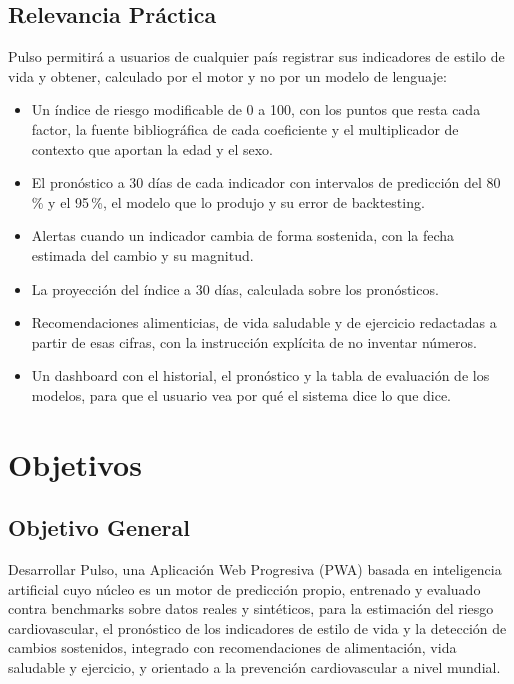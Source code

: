 \documentclass[12pt,letterpaper]{article}
\begin{document}
\subsection{Relevancia Práctica}

Pulso permitirá a usuarios de cualquier país registrar sus indicadores de estilo
de vida y obtener, calculado por el motor y no por un modelo de lenguaje:

\begin{itemize}
  \item Un índice de riesgo modificable de 0 a 100, con los puntos que resta
    cada factor, la fuente bibliográfica de cada coeficiente y el multiplicador
    de contexto que aportan la edad y el sexo.
  \item El pronóstico a 30 días de cada indicador con intervalos de predicción
    del 80\,\% y el 95\,\%, el modelo que lo produjo y su error de backtesting.
  \item Alertas cuando un indicador cambia de forma sostenida, con la fecha
    estimada del cambio y su magnitud.
  \item La proyección del índice a 30 días, calculada sobre los pronósticos.
  \item Recomendaciones alimenticias, de vida saludable y de ejercicio
    redactadas a partir de esas cifras, con la instrucción explícita de no
    inventar números.
  \item Un dashboard con el historial, el pronóstico y la tabla de evaluación
    de los modelos, para que el usuario vea por qué el sistema dice lo que dice.
\end{itemize}

\newpage

\section{Objetivos}

\subsection{Objetivo General}

Desarrollar Pulso, una Aplicación Web Progresiva (PWA) basada en inteligencia
artificial cuyo núcleo es un motor de predicción propio, entrenado y evaluado
contra benchmarks sobre datos reales y sintéticos, para la estimación del riesgo
cardiovascular, el pronóstico de los indicadores de estilo de vida y la
detección de cambios sostenidos, integrado con recomendaciones de alimentación,
vida saludable y ejercicio, y orientado a la prevención cardiovascular a nivel
mundial.
\end{document}
